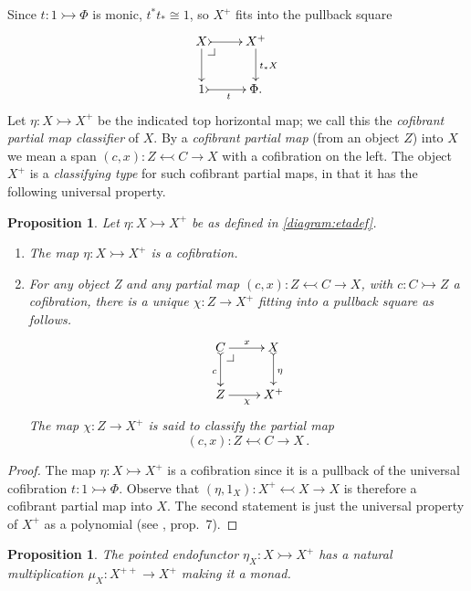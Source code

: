 \documentclass[11pt,reqno]{amsart}
\makeatletter
\newcommand{\mono}{\ensuremath{\rightarrowtail}}
\newcommand{\ra}{\ensuremath{\rightarrow}}
\newcommand{\cof}{\ensuremath{\rightarrowtail}}
\newtheorem{proposition}[theorem]{Proposition}
\theoremstyle{remark}
\theoremstyle{definition}
\newcommand{\pbcorner}[1][dr]{\save*!/#1-1.2pc/#1:(-1,1)@^{|-}\restore}
\makeatother
\begin{document}
Since $t: 1\cof \Phi$ is monic, $t^*t_*\cong 1$, so $X^+$ fits into the  pullback square
\begin{equation}\label{diagram:etadef}
\xymatrix{
X \ar[d]\pbcorner \ar@{>->}[r] & X^+ \ar[d]^{t_*X}\\
1 \ar@{>->}[r]_{t} & \Phi.
}
\end{equation}
Let $\eta : X\mono X^+$ be the indicated top horizontal map; we call this the \emph{cofibrant partial map classifier} of $X$.  By a \emph{cofibrant partial map} (from an object $Z$) into $X$ we mean a span $(c,x): Z\leftarrowtail C\ra X$ with a cofibration on the left.  The object $X^+$ is a \emph{classifying type} for such cofibrant partial maps, in that it has the following universal property.
 
\begin{proposition}\label{prop:cofparclass}
Let $\eta : X\mono X^+$ be as defined in \eqref{diagram:etadef}. 
\begin{enumerate}
\item The map $\eta : X\mono X^+$ is a cofibration.
\item For any object Z and any partial map $(c,x): Z\leftarrowtail C\ra X$, with $c : C\mono Z$ a cofibration, there is a unique $\chi : Z\ra X^+$ fitting into a pullback square as follows.
\[
\xymatrix{
C \ar@{>->}[d]_{c} \pbcorner \ar[r]^x & X \ar@{>->}[d]^{\eta}\\
Z \ar[r]_\chi & X^+
}
\]
The map $\chi : Z\ra X^+$ is said to \emph{classify} the partial map 
\[
(c,x): Z\leftarrowtail C\ra X\,.
\]
\end{enumerate}
\end{proposition}

\begin{proof}
The map $\eta : X\mono X^+$ is a cofibration since it is a pullback of the universal cofibration $t : 1\cof \Phi$. Observe that $(\eta, 1_X) : X^+\leftarrowtail X\ra X$ is therefore a cofibrant partial map into $X$.  The second statement is just the universal property of $X^+$ as a polynomial (see \cite{A:natural}, prop.~7). 
\end{proof}


\begin{proposition}\label{prop:plusmonad}
The pointed endofunctor  $\eta_X : X\mono X^+$ has a natural multiplication $\mu_X : X^{++} \ra X^+$ making it a monad.
\end{proposition}
\end{document}
